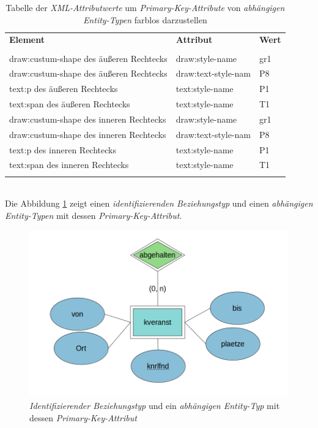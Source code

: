 \begin{table}[H]
	\centering
	\begin{tabular}{lll}
		\textbf{Element} & \textbf{Attribut}  & \textbf{Wert} \\
		\\
		draw:custum-shape des äußeren Rechtecks & draw:style-name           & gr1             \\
		draw:custum-shape des äußeren Rechtecks & draw:text-style-nam      & P8            \\
		text:p des äußeren Rechtecks & text:style-name       & P1             \\
		text:span des äußeren Rechtecks & text:style-name       & T1             \\
		draw:custum-shape des inneren Rechtecks & draw:style-name           & gr1             \\
		draw:custum-shape des inneren Rechtecks & draw:text-style-nam      & P8            \\
		text:p des inneren Rechtecks & text:style-name       & P1             \\
		text:span des inneren Rechtecks & text:style-name       & T1             \\
		\\
	\end{tabular}
	
	\caption{Tabelle der \textit{XML-Attributwerte} um \textit{Primary-Key-Attribute} von \textit{abhängigen Entity-Typen} farblos darzustellen}
	\label{tbl:beispieltabelle10}
	
\end{table}	


\noindent
\hon{}
\\
\noindent
Die Abbildung \ref{ergebnis10} zeigt einen \textit{identifizierenden Beziehungstyp} und einen \textit{abhängigen Entity-Typen} mit dessen \textit{Primary-Key-Attribut}.


\begin{figure}[H]
	\centering
	\includegraphics[width=12cm]{images/18.png}
	\caption{\textit{Identifizierender Beziehungstyp} und ein \textit{abhängigen Entity-Typ} mit dessen \textit{Primary-Key-Attribut}}
	\label{ergebnis10}
\end{figure}	

